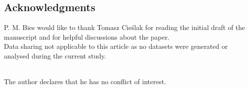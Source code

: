 \documentclass[11pt]{article}
\numberwithin{equation}{section}
\theoremstyle{plain}
\begin{document}
\subsection*{Acknowledgments}
P. M. Bies would like to thank Tomasz Cie\'slak for reading the initial draft of the manuscript and for helpful discussions about the paper.
\\

 Data sharing not applicable to this article as no datasets were generated or analysed during
the current study.\\
\\

 The author declares that he has no conflict of interest.

	
\end{document}
